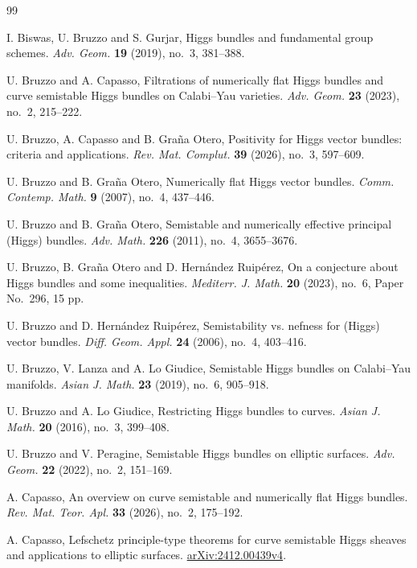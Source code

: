 \documentclass[oneside,11pt]{amsart}
\theoremstyle{definition}
\theoremstyle{remark}
\numberwithin{thm}{section}
\numberwithin{equation}{section}
\begin{document}
\begin{thebibliography}{99}


I. Biswas, U. Bruzzo and S. Gurjar,
Higgs bundles and fundamental group schemes.
\emph{Adv. Geom.} \textbf{19} (2019), no.~3, 381--388.

U. Bruzzo and A. Capasso,
Filtrations of numerically flat Higgs bundles and curve semistable Higgs bundles on Calabi--Yau varieties.
\emph{Adv. Geom.} \textbf{23} (2023), no.~2, 215--222.

U. Bruzzo, A. Capasso and B. Gra\~na Otero,
Positivity for Higgs vector bundles: criteria and applications.
\emph{Rev. Mat. Complut.} \textbf{39} (2026), no.~3, 597--609.

U. Bruzzo and B. Gra\~na Otero,
Numerically flat Higgs vector bundles.
\emph{Comm. Contemp. Math.} \textbf{9} (2007), no.~4, 437--446.

U. Bruzzo and B. Gra\~na Otero,
Semistable and numerically effective principal (Higgs) bundles.
\emph{Adv. Math.} \textbf{226} (2011), no.~4, 3655--3676.

U. Bruzzo, B. Gra\~na Otero and D. Hern\'andez Ruip\'erez,
On a conjecture about Higgs bundles and some inequalities.
\emph{Mediterr. J. Math.} \textbf{20} (2023), no.~6,
Paper No.~296, 15 pp.

U. Bruzzo and D. Hern\'andez Ruip\'erez,
Semistability vs. nefness for (Higgs) vector bundles.
\emph{Diff. Geom. Appl.} \textbf{24} (2006), no.~4, 403--416.

U. Bruzzo, V. Lanza and A. Lo Giudice,
Semistable Higgs bundles on Calabi--Yau manifolds.
\emph{Asian J. Math.} \textbf{23} (2019), no.~6, 905--918.

U. Bruzzo and A. Lo Giudice,
Restricting Higgs bundles to curves.
\emph{Asian J. Math.} \textbf{20} (2016), no.~3, 399--408.

U. Bruzzo and V. Peragine,
Semistable Higgs bundles on elliptic surfaces.
\emph{Adv. Geom.} \textbf{22} (2022), no.~2, 151--169.

A. Capasso,
An overview on curve semistable and numerically flat Higgs bundles.
\emph{Rev. Mat. Teor. Apl.} \textbf{33} (2026), no.~2, 175--192.

A. Capasso,
Lefschetz principle-type theorems for curve semistable Higgs sheaves and applications to elliptic surfaces.
\href{https://arxiv.org/abs/2412.00439v4}{arXiv:2412.00439v4}.


\end{thebibliography}
\end{document}
